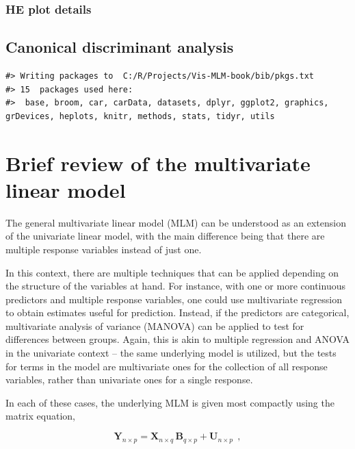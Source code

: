 \documentclass[
  letterpaper,
  10pt,
  krantz2]{krantz}
\begin{document}
\hypertarget{he-plot-details}{%
\subsection{HE plot details}\label{he-plot-details}}

\hypertarget{sec-candisc}{%
\section{Canonical discriminant analysis}\label{sec-candisc}}

\begin{verbatim}
#> Writing packages to  C:/R/Projects/Vis-MLM-book/bib/pkgs.txt
#> 15  packages used here:
#>  base, broom, car, carData, datasets, dplyr, ggplot2, graphics, grDevices, heplots, knitr, methods, stats, tidyr, utils
\end{verbatim}


\hypertarget{sec-mlm-review}{%
\chapter{Brief review of the multivariate linear
model}\label{sec-mlm-review}}

The general multivariate linear model (MLM) can be understood as an
extension of the univariate linear model, with the main difference being
that there are multiple response variables instead of just one.

In this context, there are multiple techniques that can be applied
depending on the structure of the variables at hand. For instance, with
one or more continuous predictors and multiple response variables, one
could use multivariate regression to obtain estimates useful for
prediction. Instead, if the predictors are categorical, multivariate
analysis of variance (MANOVA) can be applied to test for differences
between groups. Again, this is akin to multiple regression and ANOVA in
the univariate context -- the same underlying model is utilized, but the
tests for terms in the model are multivariate ones for the collection of
all response variables, rather than univariate ones for a single
response.

In each of these cases, the underlying MLM is given most compactly using
the matrix equation,

\[
\mathbf{Y}_{n \times p} = 
\mathbf{X}_{n \times q} \, \mathbf{B}_{q \times p} + \mathbf{U}_{n \times p} \:\: ,
\]
\end{document}
